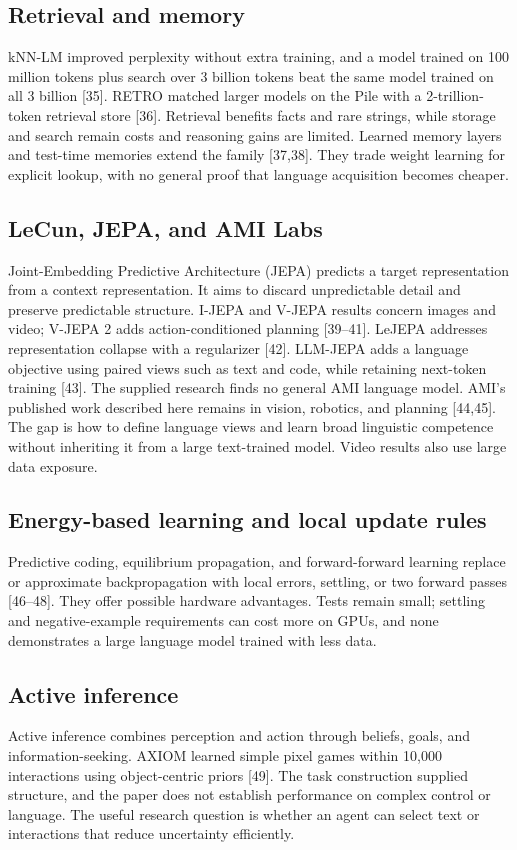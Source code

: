 \subsection{Retrieval and memory}
kNN-LM improved perplexity without extra training, and a model trained on 100 million tokens plus search over 3 billion tokens beat the same model trained on all 3 billion [35]. RETRO matched larger models on the Pile with a 2-trillion-token retrieval store [36]. Retrieval benefits facts and rare strings, while storage and search remain costs and reasoning gains are limited. Learned memory layers and test-time memories extend the family [37,38]. They trade weight learning for explicit lookup, with no general proof that language acquisition becomes cheaper.

\subsection{LeCun, JEPA, and AMI Labs}
Joint-Embedding Predictive Architecture (JEPA) predicts a target representation from a context representation. It aims to discard unpredictable detail and preserve predictable structure. I-JEPA and V-JEPA results concern images and video; V-JEPA 2 adds action-conditioned planning [39--41]. LeJEPA addresses representation collapse with a regularizer [42]. LLM-JEPA adds a language objective using paired views such as text and code, while retaining next-token training [43]. The supplied research finds no general AMI language model. AMI's published work described here remains in vision, robotics, and planning [44,45]. The gap is how to define language views and learn broad linguistic competence without inheriting it from a large text-trained model. Video results also use large data exposure.

\subsection{Energy-based learning and local update rules}
Predictive coding, equilibrium propagation, and forward-forward learning replace or approximate backpropagation with local errors, settling, or two forward passes [46--48]. They offer possible hardware advantages. Tests remain small; settling and negative-example requirements can cost more on GPUs, and none demonstrates a large language model trained with less data.

\subsection{Active inference}
Active inference combines perception and action through beliefs, goals, and information-seeking. AXIOM learned simple pixel games within 10,000 interactions using object-centric priors [49]. The task construction supplied structure, and the paper does not establish performance on complex control or language. The useful research question is whether an agent can select text or interactions that reduce uncertainty efficiently.

